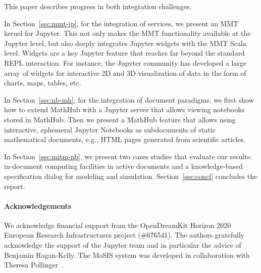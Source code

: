 
This paper describes progress in both integration challenges.

In Section~\ref{sec:mmt-jp}, for the integration of services, we present an MMT kernel for Jupyter.
This not only makes the MMT functionality available at the Jupyter level, but also deeply integrates Jupyter widgets with the MMT Scala level.
Widgets are a key Jupyter feature that reaches far beyond the standard REPL interaction.
For instance, the Jupyter community has developed a large array of widgets for interactive 2D and 3D visualization of data in the form of charts, maps, tables, etc.

In Section~\ref{sec:nb-mh}, for the integration of document paradigms, we first show how to extend MathHub with a Jupyter server that allows viewing notebooks stored in MathHub.
Then we present a MathHub feature that allows using interactive, ephemeral Jupyter Notebooks as subdocuments of static mathematical documents, e.g., HTML pages generated from scientific articles.

In Section~\ref{sec:mitm-nb}, we present two cases studies that evaluate our results: in-document computing facilities in active documents and a knowledge-based specification dialog for modeling and simulation.
Section~\ref{sec:concl} concludes the report.

\paragraph{Acknowledgements}
We acknowledge financial support from the OpenDreamKit Horizon 2020 European Research Infrastructures project (\#676541).
The authors gratefully acknowledge the support of the Jupyter team and in particular the advice of Benjamin Ragan-Kelly.
The MoSIS system was developed in collaboration with Theresa Pollinger~\cite{PolKohKoe:kacse18}. 

